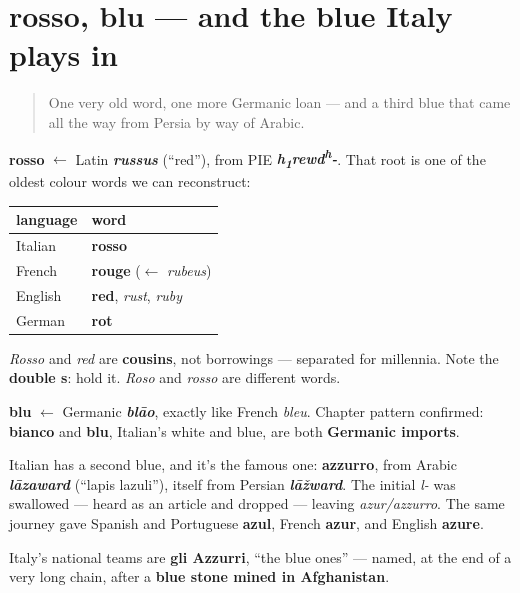 \section[rosso, blu]{rosso, blu — and the blue Italy plays in}

\label{lesson:IT-C13-rosso-blu}



\begin{quote}
One very old word, one more Germanic loan — and a third blue that came all the way from Persia by way of Arabic.
\end{quote}

\begin{cousinweb}
\textbf{rosso} $\leftarrow$ Latin \emph{\textbf{russus}} (\textquotedblleft{}red\textquotedblright{}), from PIE \emph{\textbf{h\textsubscript{1}rewd\textsuperscript{h}-}}. That root is one of the oldest colour words we can reconstruct:

\noindent
\begin{tabularx}{\linewidth}{@{}>{\raggedright\arraybackslash}X>{\raggedright\arraybackslash}X@{}}
\toprule
\textbf{language} & \textbf{word} \\
\midrule
Italian & \textbf{rosso} \\
French & \textbf{rouge} ($\leftarrow$ \emph{rubeus}) \\
English & \textbf{red}, \emph{rust}, \emph{ruby} \\
German & \textbf{rot} \\
\bottomrule
\end{tabularx}

\emph{Rosso} and \emph{red} are \textbf{cousins}, not borrowings — separated for millennia. Note the \textbf{double s}: hold it. \emph{Roso} and \emph{rosso} are different words.
\end{cousinweb}

\begin{cousinweb}
\textbf{blu} $\leftarrow$ Germanic \emph{\textbf{blāo}}, exactly like French \emph{bleu}. Chapter pattern confirmed: \textbf{bianco} and \textbf{blu}, Italian's white and blue, are both \textbf{Germanic imports}.
\end{cousinweb}

\begin{cousinweb}
Italian has a second blue, and it's the famous one: \textbf{azzurro}, from Arabic \emph{\textbf{lāzaward}} (\textquotedblleft{}lapis lazuli\textquotedblright{}), itself from Persian \emph{\textbf{lāžward}}. The initial \emph{l-} was swallowed — heard as an article and dropped — leaving \emph{azur/azzurro}. The same journey gave Spanish and Portuguese \textbf{azul}, French \textbf{azur}, and English \textbf{azure}.

Italy's national teams are \textbf{gli Azzurri}, \textquotedblleft{}the blue ones\textquotedblright{} — named, at the end of a very long chain, after a \textbf{blue stone mined in Afghanistan}.
\end{cousinweb}

